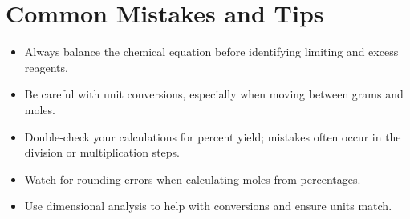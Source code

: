 \documentclass[12pt]{article}
\begin{document}
\section*{Common Mistakes and Tips}
\begin{itemize}
    \item Always balance the chemical equation before identifying limiting and excess reagents.
    \item Be careful with unit conversions, especially when moving between grams and moles.
    \item Double-check your calculations for percent yield; mistakes often occur in the division or multiplication steps.
    \item Watch for rounding errors when calculating moles from percentages.
    \item Use dimensional analysis to help with conversions and ensure units match.
\end{itemize}
\end{document}
